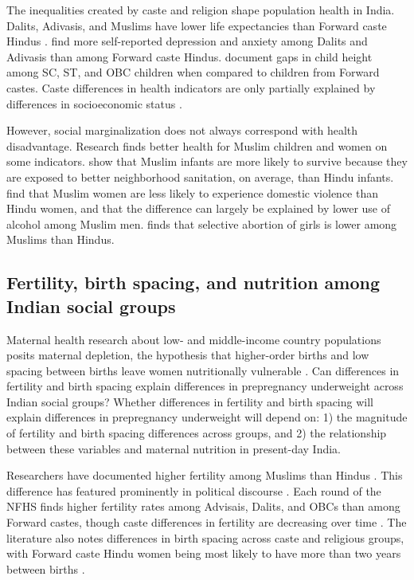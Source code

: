 \documentclass[12pt]{article}
\begin{document}
The inequalities created by caste and religion shape population health in India. Dalits, Adivasis, and Muslims have lower life expectancies than Forward caste Hindus \citep{vyas2022social, gupta2022large}.  \cite{gupta2020caste} find more self-reported depression and anxiety among Dalits and Adivasis than among Forward caste Hindus.  \cite{coffey2019local} document gaps in child height among SC, ST, and OBC children when compared to children from Forward castes. Caste differences in health indicators are only partially explained by differences in socioeconomic status \citep{bora2019persistent, kumar2016explaining, vyas2022social, dutta2020effect}. 

However, social marginalization does not always correspond with health disadvantage.  Research finds better health for Muslim children and women on some indicators.  \cite{geruso2018neighborhood} show that Muslim infants are more likely to survive because they are exposed to better neighborhood sanitation, on average, than Hindu infants. \cite{sharma_gupta_2025} find that Muslim women are less likely to experience domestic violence than Hindu women, and that the difference can largely be explained by lower use of alcohol among Muslim men.  \cite{visaria2015preference} finds that selective abortion of girls is lower among Muslims than Hindus. 

\subsection{Fertility, birth spacing, and nutrition among Indian social groups}

Maternal health research about low- and middle-income country populations posits maternal depletion, the hypothesis that higher-order births and low spacing between births leave women nutritionally vulnerable \citep{winkvist1992new, king2003risk, shell2004maternal, bauserman2020relationship}.  Can differences in fertility and birth spacing explain differences in prepregnancy underweight across Indian social groups?  Whether differences in fertility and birth spacing will explain differences in prepregnancy underweight will depend on: 1) the magnitude of fertility and birth spacing differences across groups, and 2) the relationship between these variables and maternal nutrition in present-day India. 

Researchers have documented higher fertility among Muslims than Hindus \citep{dharmalingam2004pervasive, james2005accelerated}.  This difference has featured prominently in political discourse \citep{jeffery2002population, singh2020numbering}.  Each round of the NFHS finds higher fertility rates among Advisais, Dalits, and OBCs than among Forward castes, though caste differences in fertility are decreasing over time \citep{srinivas2024rapid}. The literature also notes differences in birth spacing across caste and religious groups, with Forward caste Hindu women being most likely to have more than two years between births \citep{kundu2025short, bhalotra2008birth}.  
\end{document}
